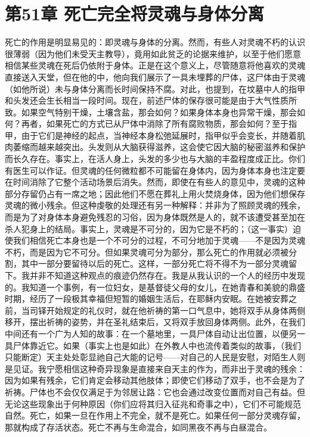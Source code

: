 
\section{第51章 死亡完全将灵魂与身体分离}

死亡的作用是明显易见的：即灵魂与身体的分离。然而，有些人对灵魂不朽的认识很薄弱（因为他们未受天主教导），竟用如此贫乏的论据来维护，以至于他们愿意相信某些灵魂在死后仍依附于身体。正是在这个意义上，尽管随意将他喜欢的灵魂直接送入天堂，但在他的中，他向我们展示了一具未埋葬的尸体，这尸体由于灵魂（如他所说）未与身体分离而长时间保持不腐。对此，也提到，在坟墓中人的指甲和头发还会生长相当一段时间。现在，前述尸体的保存很可能是由于大气性质所致。如果空气特别干燥，土壤含盐，那会如何？如果身体本身也异常干燥，那会如何？再者，如果死亡的方式已从尸体中消除了所有腐败物质，那会如何？至于指甲，由于它们是神经的起点，当神经本身松弛延展时，指甲似乎会变长，并随着肌肉萎缩而越来越突出。头发则从大脑获得滋养，这会使它因大脑的秘密滋养和保护而长久存在。事实上，在活人身上，头发的多少也与大脑的丰盈程度成正比。你们有医生可以作证。但灵魂的任何微粒都不可能留在身体内，因为身体本身也注定要在时间消除了它整个活动场景后消失。然而，即使在有些人的意见中，灵魂的这种部分存留仍占有一席之地；因此他们不愿在葬礼上用火焚烧身体，因为他们想保存灵魂的微小残余。但这种虔敬的处理还有另一种解释：并非为了照顾灵魂的残余，而是为了对身体本身避免残忍的习俗，因为身体既然是人的，就不该遭受甚至加在杀人犯身上的结局。事实上，灵魂是不可分的，因为它是不朽的；（这一事实）迫使我们相信死亡本身也是一个不可分的过程，不可分地加于灵魂——不是因为灵魂不朽，而是因为它不可分。但如果灵魂可分为部分，那么死亡的作用就必须被分割，其中一部分要留待以后的死亡。这样，一部分死亡将不得不为一部分灵魂留下。我并非不知道这种观点的痕迹仍然存在。我是从我认识的一个人的经历中发现的。我知道一个事例，有一位妇女，是基督徒父母的女儿，在她青春和美貌的鼎盛时期，经历了一段极其幸福但短暂的婚姻生活后，在耶稣内安眠。在她被安葬之前，当司铎开始规定的礼仪时，就在他祈祷的第一口气息中，她将双手从身体两侧移开，摆出祈祷的姿势，并在圣礼结束后，又将双手放回身体两侧。此外，在我们中间还有一个广为人知的故事：在一个墓地里，一具尸体自动让出位置，以便另一具尸体靠近它。如果（事实上也是如此）在外教人中也流传着类似的故事，（我们只能断定）天主处处彰显祂自己大能的记号——对自己的人民是安慰，对陌生人则是见证。我宁愿相信这种奇异现象是直接来自天主的作为，而非出于灵魂的残余：因为如果有残余，它们肯定会移动其他肢体；即使它们移动了双手，也不会是为了祈祷。尸体也不会仅仅满足于为邻居让路：它也会通过改变位置而对自己有益。但无论这些现象出于何种原因（你们应将其归入征兆和奇事之中），它们不可能规范自然。死亡，如果一旦在作用上不完全，就不是死亡。如果任何一部分灵魂存留，那就构成了存活状态。死亡不再与生命混合，如同黑夜不再与白昼混合。\par

